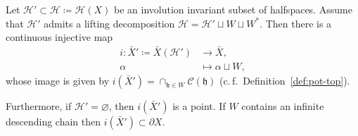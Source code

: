 \begin{lemma}[{\cite[Lemma~2.6]{MR3509968}}]
  \label{lem:lifting}
  Let \(\mathcal{H}' \subset \mathcal{H} \coloneqq \mathcal{H}(X)\) be an involution invariant subset of halfspaces. Assume that \(\mathcal{H}'\) admits a lifting decomposition \(\mathcal{H} = \mathcal{H}' \sqcup W \sqcup W^\ast\). Then there is a continuous injective map
  \begin{align*}
    i\colon \bar X' \coloneqq \bar X(\mathcal{H}') & \to \bar X,\\
            \alpha & \mapsto \alpha \sqcup W,
  \end{align*}
  whose image is given by \(i(\bar X') = \cap_{\mathfrak{h} \in W} \mathcal{C}(\mathfrak{h})\) (c.\,f.\ Definition~\ref{def:pot-top}).

  Furthermore, if \(\mathcal{H}' = \varnothing\), then \(i(\bar X')\) is a point. If \(W\) contains an infinite descending chain then \(i(\bar X') \subset \partial X\).
\end{lemma}

